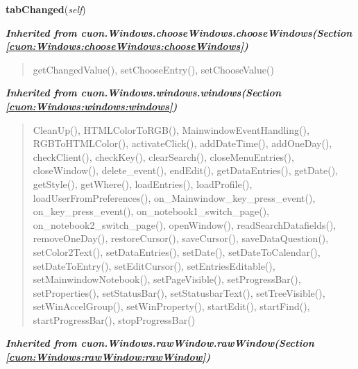     \label{cuon:Garden:hibernation:hibernationwindow:tabChanged}

    \vspace{0.5ex}

\hspace{.8\funcindent}\begin{boxedminipage}{\funcwidth}

    \raggedright \textbf{tabChanged}(\textit{self})

\setlength{\parskip}{2ex}
\setlength{\parskip}{1ex}
    \end{boxedminipage}


\large{\textbf{\textit{Inherited from cuon.Windows.chooseWindows.chooseWindows\textit{(Section \ref{cuon:Windows:chooseWindows:chooseWindows})}}}}

\begin{quote}
getChangedValue(), setChooseEntry(), setChooseValue()
\end{quote}

\large{\textbf{\textit{Inherited from cuon.Windows.windows.windows\textit{(Section \ref{cuon:Windows:windows:windows})}}}}

\begin{quote}
CleanUp(), HTMLColorToRGB(), MainwindowEventHandling(), RGBToHTMLColor(), activateClick(), addDateTime(), addOneDay(), checkClient(), checkKey(), clearSearch(), closeMenuEntries(), closeWindow(), delete\_event(), endEdit(), getDataEntries(), getDate(), getStyle(), getWhere(), loadEntries(), loadProfile(), loadUserFromPreferences(), on\_Mainwindow\_key\_press\_event(), on\_key\_press\_event(), on\_notebook1\_switch\_page(), on\_notebook2\_switch\_page(), openWindow(), readSearchDatafields(), removeOneDay(), restoreCursor(), saveCursor(), saveDataQuestion(), setColor2Text(), setDataEntries(), setDate(), setDateToCalendar(), setDateToEntry(), setEditCursor(), setEntriesEditable(), setMainwindowNotebook(), setPageVisible(), setProgressBar(), setProperties(), setStatusBar(), setStatusbarText(), setTreeVisible(), setWinAccelGroup(), setWinProperty(), startEdit(), startFind(), startProgressBar(), stopProgressBar()
\end{quote}

\large{\textbf{\textit{Inherited from cuon.Windows.rawWindow.rawWindow\textit{(Section \ref{cuon:Windows:rawWindow:rawWindow})}}}}

